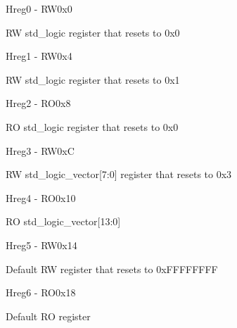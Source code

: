 \documentclass{article}
\begin{document}
\begin{register}{H}{reg0 - RW}{0x0}
  \par RW std\_logic register that resets to 0x0 \regnewline
  \label{reg0}
  \regnewline  
\end{register}

\begin{register}{H}{reg1 - RW}{0x4}
  \par RW std\_logic register that resets to 0x1 \regnewline
  \label{reg1}
  \regnewline
\end{register}

\begin{register}{H}{reg2 - RO}{0x8}
  \par RO std\_logic register that resets to 0x0 \regnewline
  \label{reg2}
  \regnewline
\end{register}

\begin{register}{H}{reg3 - RW}{0xC}
  \par RW std\_logic\_vector[7:0] register that resets to 0x3 \regnewline
  \label{reg3}
  \regnewline
\end{register}

\begin{register}{H}{reg4 - RO}{0x10}
  \par RO std\_logic\_vector[13:0] \regnewline
  \label{reg4}
  \regnewline
\end{register}

\begin{register}{H}{reg5 - RW}{0x14}
  \par Default RW register that resets to 0xFFFFFFFF \regnewline
  \label{reg5}
  \regnewline
\end{register}

\begin{register}{H}{reg6 - RO}{0x18}
  \par Default RO register \regnewline
  \label{reg6}
  \regnewline
\end{register}
\end{document}
